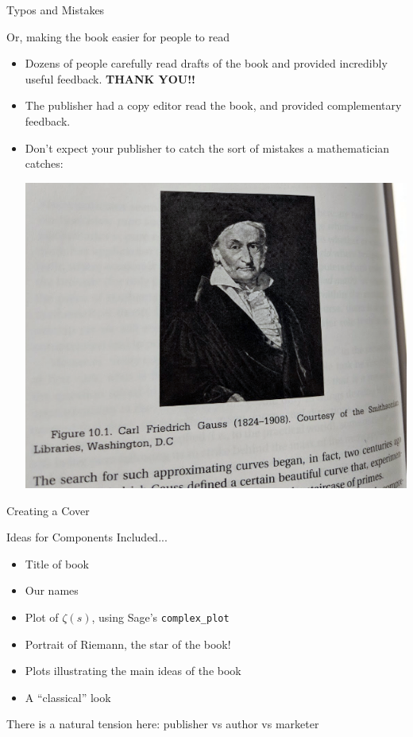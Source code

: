 \documentclass{beamer}
\begin{document}
\begin{frame}{Typos and Mistakes}
\begin{block}{Or, making the book easier for people to read}
  \begin{itemize}
    \item Dozens of people carefully read drafts of
          the book and provided incredibly useful feedback.
          \textbf{THANK YOU!!}
    \item The publisher had a copy editor read the book,
          and provided complementary feedback.
    \item Don't expect your publisher to catch the sort of
          mistakes a mathematician catches:
          \begin{center}
            \includegraphics[height=.45\textheight]{pics/gauss}
          \end{center}
  \end{itemize}
  \end{block}
\end{frame}


\begin{frame}{Creating a Cover}


\begin{block}{Ideas for Components Included...}
  \begin{itemize}
    \item Title of book
    \item Our names
    \item Plot of $\zeta(s)$, using Sage's {\tt complex\_plot}
    \item Portrait of Riemann, the star of the book!
    \item Plots illustrating the main ideas of the book
    \item A ``classical'' look
  \end{itemize}
\end{block}

\vfill
There is a natural tension here: publisher vs author vs marketer

\end{frame}
\end{document}
